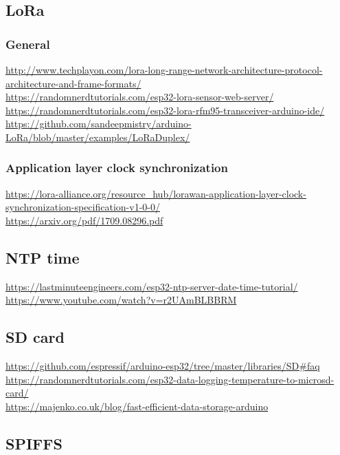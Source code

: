 \documentclass[11pt,a4paper]{article}
\numberwithin{equation}{section}   %
\numberwithin{figure}{section}     %
\numberwithin{table}{section}      %
\begin{document}
\subsection{LoRa}

\subsubsection{General}

\url{http://www.techplayon.com/lora-long-range-network-architecture-protocol-architecture-and-frame-formats/}\\[4pt]
\url{https://randomnerdtutorials.com/esp32-lora-sensor-web-server/}\\[4pt]
\url{https://randomnerdtutorials.com/esp32-lora-rfm95-transceiver-arduino-ide/}\\[4pt]
\url{https://github.com/sandeepmistry/arduino-LoRa/blob/master/examples/LoRaDuplex/}

\subsubsection{Application layer clock synchronization}

\url{https://lora-alliance.org/resource_hub/lorawan-application-layer-clock-synchronization-specification-v1-0-0/}\\[4pt]
\url{https://arxiv.org/pdf/1709.08296.pdf}


\subsection{NTP time}

\url{https://lastminuteengineers.com/esp32-ntp-server-date-time-tutorial/}\\[4pt]
\url{https://www.youtube.com/watch?v=r2UAmBLBBRM}


\subsection{SD card}

\url{https://github.com/espressif/arduino-esp32/tree/master/libraries/SD#faq}\\[4pt]
\url{https://randomnerdtutorials.com/esp32-data-logging-temperature-to-microsd-card/}\\[4pt]
\url{https://majenko.co.uk/blog/fast-efficient-data-storage-arduino}


\subsection{SPIFFS}
\end{document}

